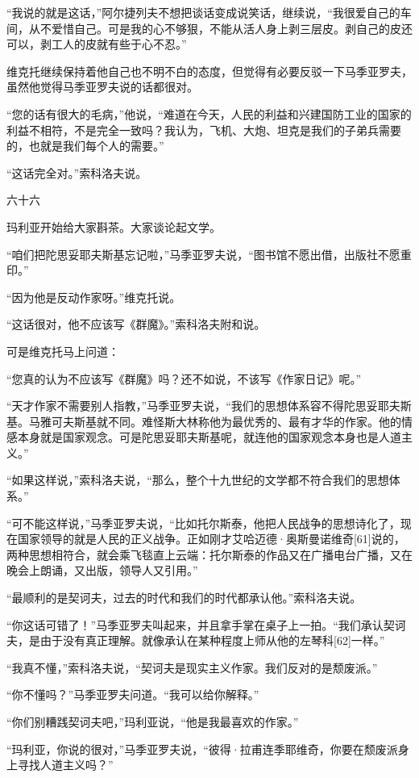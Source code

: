 “我说的就是这话，”阿尔捷列夫不想把谈话变成说笑话，继续说，“我很爱自己的车间，从不爱惜自己。可是我的心不够狠，不能从活人身上剥三层皮。剥自己的皮还可以，剥工人的皮就有些于心不忍。”

维克托继续保持着他自己也不明不白的态度，但觉得有必要反驳一下马季亚罗夫，虽然他觉得马季亚罗夫说的话都很对。

“您的话有很大的毛病，”他说，“难道在今天，人民的利益和兴建国防工业的国家的利益不相符，不是完全一致吗？我认为，飞机、大炮、坦克是我们的子弟兵需要的，也就是我们每个人的需要。”

“这话完全对。”索科洛夫说。

六十六

玛利亚开始给大家斟茶。大家谈论起文学。

“咱们把陀思妥耶夫斯基忘记啦，”马季亚罗夫说，“图书馆不愿出借，出版社不愿重印。”

“因为他是反动作家呀。”维克托说。

“这话很对，他不应该写《群魔》。”索科洛夫附和说。

可是维克托马上问道：

“您真的认为不应该写《群魔》吗？还不如说，不该写《作家日记》呢。”

“天才作家不需要别人指教，”马季亚罗夫说，“我们的思想体系容不得陀思妥耶夫斯基。马雅可夫斯基就不同。难怪斯大林称他为最优秀的、最有才华的作家。他的情感本身就是国家观念。可是陀思妥耶夫斯基呢，就连他的国家观念本身也是人道主义。”

“如果这样说，”索科洛夫说，“那么，整个十九世纪的文学都不符合我们的思想体系。”

“可不能这样说，”马季亚罗夫说，“比如托尔斯泰，他把人民战争的思想诗化了，现在国家领导的就是人民的正义战争。正如刚才艾哈迈德·奥斯曼诺维奇[61]说的，两种思想相符合，就会乘飞毯直上云端：托尔斯泰的作品又在广播电台广播，又在晚会上朗诵，又出版，领导人又引用。”

“最顺利的是契诃夫，过去的时代和我们的时代都承认他。”索科洛夫说。

“你这话可错了！”马季亚罗夫叫起来，并且拿手掌在桌子上一拍。“我们承认契诃夫，是由于没有真正理解。就像承认在某种程度上师从他的左琴科[62]一样。”

“我真不懂，”索科洛夫说，“契诃夫是现实主义作家。我们反对的是颓废派。”

“你不懂吗？”马季亚罗夫问道。“我可以给你解释。”

“你们别糟践契诃夫吧，”玛利亚说，“他是我最喜欢的作家。”

“玛利亚，你说的很对，”马季亚罗夫说，“彼得·拉甫连季耶维奇，你要在颓废派身上寻找人道主义吗？”

